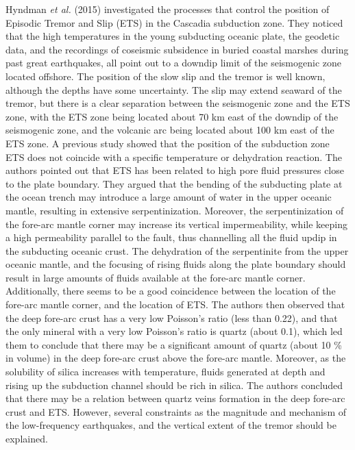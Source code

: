 \documentclass[main.tex]{subfiles}
\begin{document}
Hyndman \textit{et al.} (2015) investigated the processes that control the position of Episodic Tremor and Slip (ETS) in the Cascadia subduction zone. They noticed that the high temperatures in the young subducting oceanic plate, the geodetic data, and the recordings of coseismic subsidence in buried coastal marshes during past great earthquakes, all point out to a downdip limit of the seismogenic zone located offshore. The position of the slow slip and the tremor is well known, although the depths have some uncertainty. The slip may extend seaward of the tremor, but there is a clear separation between the seismogenic zone and the ETS zone, with the ETS zone being located about 70 km east of the downdip of the seismogenic zone, and the volcanic arc being located about 100 km east of the ETS zone. A previous study showed that the position of the subduction zone ETS does not coincide with a specific temperature or dehydration reaction. The authors pointed out that ETS has been related to high pore fluid pressures close to the plate boundary. They argued that the bending of the subducting plate at the ocean trench may introduce a large amount of water in the upper oceanic mantle, resulting in extensive serpentinization. Moreover, the serpentinization of the fore-arc mantle corner may increase its vertical impermeability, while keeping a high permeability parallel to the fault, thus channelling all the fluid updip in the subducting oceanic crust. The dehydration of the serpentinite from the upper oceanic mantle, and the focusing of rising fluids along the plate boundary should result in large amounts of fluids available at the fore-arc mantle corner. Additionally, there seems to be a good coincidence between the location of the fore-arc mantle corner, and the location of ETS. The authors then observed that the deep fore-arc crust has a very low Poisson's ratio (less than 0.22), and that the only mineral with a very low Poisson's ratio is quartz (about 0.1), which led them to conclude that there may be a significant amount of quartz (about 10 \% in volume) in the deep fore-arc crust above the fore-arc mantle. Moreover, as the solubility of silica increases with temperature, fluids generated at depth and rising up the subduction channel should be rich in silica. The authors concluded that there may be a relation between quartz veins formation in the deep fore-arc crust and ETS. However, several constraints as the magnitude and mechanism of the low-frequency earthquakes, and the vertical extent of the tremor should be explained. \\
\end{document}
